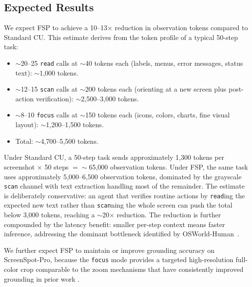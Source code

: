 \documentclass[11pt,a4paper]{article}
\begin{document}
\subsection{Expected Results}

We expect FSP to achieve a 10--13$\times$ reduction in observation tokens compared to Standard CU. This estimate derives from the token profile of a typical 50-step task:

\begin{itemize}
    \item $\sim$20--25 \texttt{read} calls at $\sim$40 tokens each (labels, menus, error messages, status text): $\sim$1{,}000 tokens.
    \item $\sim$12--15 \texttt{scan} calls at $\sim$200 tokens each (orienting at a new screen plus post-action verification): $\sim$2{,}500--3{,}000 tokens.
    \item $\sim$8--10 \texttt{focus} calls at $\sim$150 tokens each (icons, colors, charts, fine visual layout): $\sim$1{,}200--1{,}500 tokens.
    \item Total: $\sim$4{,}700--5{,}500 tokens.
\end{itemize}

Under Standard CU, a 50-step task sends approximately 1{,}300 tokens per screenshot $\times$ 50 steps $= \sim$65{,}000 observation tokens. Under FSP, the same task uses approximately 5{,}000--6{,}500 observation tokens, dominated by the grayscale \texttt{scan} channel with text extraction handling most of the remainder. The estimate is deliberately conservative: an agent that verifies routine actions by \texttt{read}ing the expected new text rather than \texttt{scan}ning the whole screen can push the total below 3{,}000 tokens, reaching a $\sim$20$\times$ reduction. The reduction is further compounded by the latency benefit: smaller per-step context means faster inference, addressing the dominant bottleneck identified by OSWorld-Human~\cite{osworld-human}.

We further expect FSP to maintain or improve grounding accuracy on ScreenSpot-Pro, because the \texttt{focus} mode provides a targeted high-resolution full-color crop comparable to the zoom mechanisms that have consistently improved grounding in prior work \cite{regionfocus, zoomclick, adazoom-gui, gui-eyes}.


\end{document}
